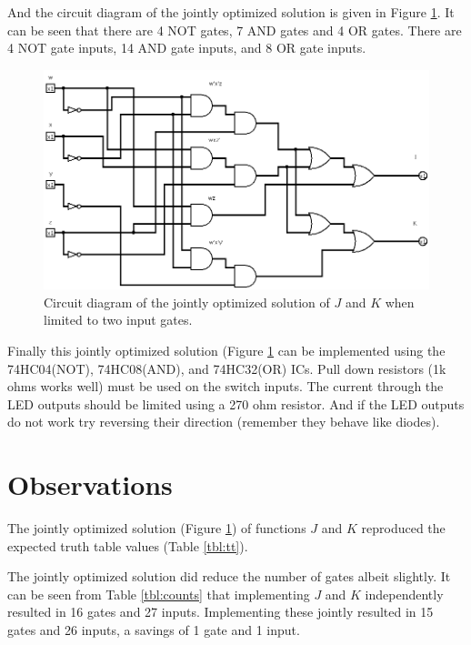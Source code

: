 \documentclass[12pt]{article}
\begin{document}
And the circuit diagram of the jointly optimized solution is given
in Figure \ref{fig:JKjointcircuit}.
It can be seen that there are 4 NOT gates, 7 AND gates and 4 OR gates.
There are 4 NOT gate inputs, 14 AND gate inputs, and 8 OR gate inputs.

\begin{figure}[tbp]
\center
\includegraphics[scale=0.5]{JKjoint-01}
\caption{Circuit diagram of the jointly optimized solution of $J$ and $K$ when limited to two input gates.}
\label{fig:JKjointcircuit}
\end{figure}

Finally this jointly optimized solution (Figure \ref{fig:JKjointcircuit}
can be implemented using the 74HC04(NOT), 74HC08(AND),
and 74HC32(OR) ICs.
Pull down resistors (1k ohms works well) must be used on the switch inputs.
The current through the LED outputs should be limited using a 270 ohm resistor.
And if the LED outputs do not work try reversing their direction (remember
they behave like diodes).

\clearpage

\section{Observations}

The jointly optimized solution (Figure \ref{fig:JKjointcircuit}) of functions
$J$ and $K$ reproduced the expected truth table values (Table \ref{tbl:tt}).

The jointly optimized solution did reduce the number of gates
albeit slightly.
It can be seen from Table \ref{tbl:counts} that implementing
$J$ and $K$ independently resulted in 16 gates and 27 inputs.
Implementing these jointly resulted in 15 gates and 26 inputs,
a savings of 1 gate and 1 input.
\end{document}
